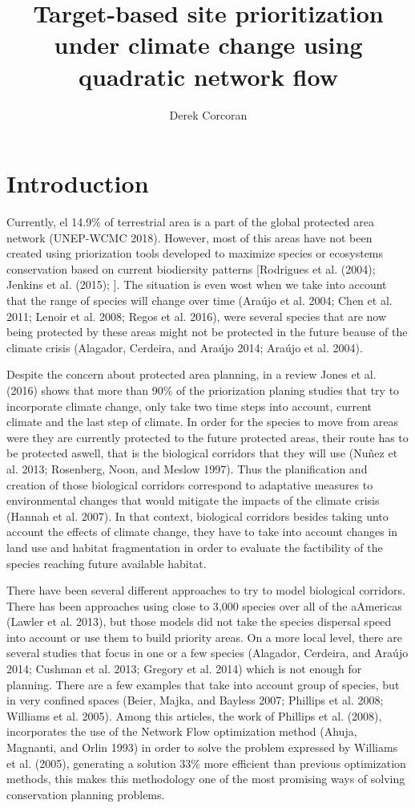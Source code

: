 \documentclass[]{article}
\title{Target-based site prioritization under climate change using quadratic network flow}
\author{Derek Corcoran}
\date{}
\begin{document}
\maketitle

\hypertarget{introduction}{%
\section{Introduction}\label{introduction}}

Currently, el 14.9\% of terrestrial area is a part of the global protected area network (UNEP-WCMC 2018). However, most of this areas have not been created using priorization tools developed to maximize species or ecosystems conservation based on current biodiersity patterns {[}Rodrigues et al. (2004); Jenkins et al. (2015); {]}. The situation is even wost when we take into account that the range of species will change over time (Araújo et al. 2004; Chen et al. 2011; Lenoir et al. 2008; Regos et al. 2016), were several species that are now being protected by these areas might not be protected in the future beause of the climate crisis (Alagador, Cerdeira, and Araújo 2014; Araújo et al. 2004).

Despite the concern about protected area planning, in a review Jones et al. (2016) shows that more than 90\% of the priorization planing studies that try to incorporate climate change, only take two time steps into account, current climate and the last step of climate. In order for the species to move from areas were they are currently protected to the future protected areas, their route has to be protected aswell, that is the biological corridors that they will use (Nuñez et al. 2013; Rosenberg, Noon, and Meslow 1997). Thus the planification and creation of those biological corridors correspond to adaptative measures to environmental changes that would mitigate the impacts of the climate crisis (Hannah et al. 2007). In that context, biological corridors besides taking unto account the effects of climate change, they have to take into account changes in land use and habitat fragmentation in order to evaluate the factibility of the species reaching future available habitat.

There have been several different approaches to try to model biological corridors. There has been approaches using close to 3,000 species over all of the aAmericas (Lawler et al. 2013), but those models did not take the species dispersal speed into account or use them to build priority areas. On a more local level, there are several studies that focus in one or a few species (Alagador, Cerdeira, and Araújo 2014; Cushman et al. 2013; Gregory et al. 2014) which is not enough for planning. There are a few examples that take into account group of species, but in very confined spaces (Beier, Majka, and Bayless 2007; Phillips et al. 2008; Williams et al. 2005). Among this articles, the work of Phillips et al. (2008), incorporates the use of the Network Flow optimization method (Ahuja, Magnanti, and Orlin 1993) in order to solve the problem expressed by Williams et al. (2005), generating a solution 33\% more efficient than previous optimization methods, this makes this methodology one of the most promising ways of solving conservation planning problems.
\end{document}
